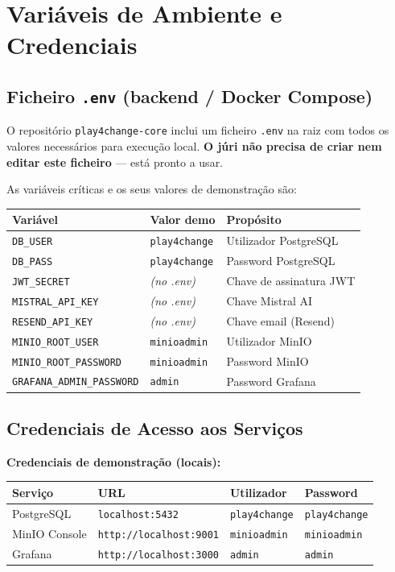 \documentclass[12pt,a4paper]{article}
\newcommand{\file}[1]{\texttt{\small\color{darkgray}#1}}
\newcommand{\env}[1]{\texttt{\small\color{iselred}#1}}
\begin{document}
\section{Variáveis de Ambiente e Credenciais}

\subsection{Ficheiro \texttt{.env} (backend / Docker Compose)}

O repositório \texttt{play4change-core} inclui um ficheiro \file{.env} na raiz com todos os valores necessários para execução local. \textbf{O júri não precisa de criar nem editar este ficheiro} — está pronto a usar.

As variáveis críticas e os seus valores de demonstração são:

\begin{center}
\begin{tabularx}{\textwidth}{llX}
\toprule
\textbf{Variável} & \textbf{Valor demo} & \textbf{Propósito} \\
\midrule
\env{DB\_USER} & \texttt{play4change} & Utilizador PostgreSQL \\
\env{DB\_PASS} & \texttt{play4change} & Password PostgreSQL \\
\env{JWT\_SECRET} & \textit{(no .env)} & Chave de assinatura JWT \\
\env{MISTRAL\_API\_KEY} & \textit{(no .env)} & Chave Mistral AI \\
\env{RESEND\_API\_KEY} & \textit{(no .env)} & Chave email (Resend) \\
\env{MINIO\_ROOT\_USER} & \texttt{minioadmin} & Utilizador MinIO \\
\env{MINIO\_ROOT\_PASSWORD} & \texttt{minioadmin} & Password MinIO \\
\env{GRAFANA\_ADMIN\_PASSWORD} & \texttt{admin} & Password Grafana \\
\bottomrule
\end{tabularx}
\end{center}

\subsection{Credenciais de Acesso aos Serviços}

\begin{mdframed}[style=infobox]
\textbf{Credenciais de demonstração (locais):}

\begin{tabular}{llll}
\textbf{Serviço} & \textbf{URL} & \textbf{Utilizador} & \textbf{Password} \\
\hline
PostgreSQL & \texttt{localhost:5432} & \texttt{play4change} & \texttt{play4change} \\
MinIO Console & \texttt{http://localhost:9001} & \texttt{minioadmin} & \texttt{minioadmin} \\
Grafana & \texttt{http://localhost:3000} & \texttt{admin} & \texttt{admin} \\
\end{tabular}
\end{mdframed}
\end{document}
